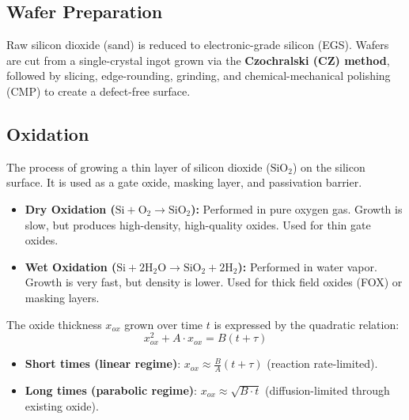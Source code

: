 \documentclass[12pt,a4paper]{article}
\begin{document}
\subsection{Wafer Preparation}
Raw silicon dioxide (sand) is reduced to electronic-grade silicon (EGS). Wafers are cut from a single-crystal ingot grown via the \textbf{Czochralski (CZ) method}, followed by slicing, edge-rounding, grinding, and chemical-mechanical polishing (CMP) to create a defect-free surface.

\subsection{Oxidation}
The process of growing a thin layer of silicon dioxide ($\text{SiO}_2$) on the silicon surface. It is used as a gate oxide, masking layer, and passivation barrier.
\begin{itemize}[leftmargin=*, itemsep=3pt]
  \item \textbf{Dry Oxidation ($\text{Si} + \text{O}_2 \to \text{SiO}_2$):} Performed in pure oxygen gas. Growth is slow, but produces high-density, high-quality oxides. Used for thin gate oxides.
  \item \textbf{Wet Oxidation ($\text{Si} + 2\text{H}_2\text{O} \to \text{SiO}_2 + 2\text{H}_2$):} Performed in water vapor. Growth is very fast, but density is lower. Used for thick field oxides (FOX) or masking layers.
\end{itemize}

\begin{tcolorbox}[defbox, title={\textbf{Deal-Grove Model of Oxidation}}]
The oxide thickness $x_{ox}$ grown over time $t$ is expressed by the quadratic relation:
\begin{equation}
  x_{ox}^2 + A \cdot x_{ox} = B(t + \tau)
\end{equation}
\begin{itemize}[leftmargin=*, itemsep=2.5pt, topsep=2.5pt]
  \item \textbf{Short times (linear regime)}: $x_{ox} \approx \frac{B}{A}(t + \tau)$ (reaction rate-limited).
  \item \textbf{Long times (parabolic regime)}: $x_{ox} \approx \sqrt{B \cdot t}$ (diffusion-limited through existing oxide).
\end{itemize}
\end{tcolorbox}
\end{document}
